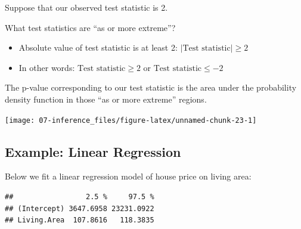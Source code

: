 \documentclass[
]{book}
\newenvironment{Shaded}{\begin{snugshade}}{\end{snugshade}}
\newcommand{\CommentTok}[1]{\textcolor[rgb]{0.56,0.35,0.01}{\textit{#1}}}
\newcommand{\DataTypeTok}[1]{\textcolor[rgb]{0.13,0.29,0.53}{#1}}
\newcommand{\KeywordTok}[1]{\textcolor[rgb]{0.13,0.29,0.53}{\textbf{#1}}}
\newcommand{\NormalTok}[1]{#1}
\newcommand{\OperatorTok}[1]{\textcolor[rgb]{0.81,0.36,0.00}{\textbf{#1}}}
\newcommand{\StringTok}[1]{\textcolor[rgb]{0.31,0.60,0.02}{#1}}
\providecommand{\tightlist}{%
  \setlength{\itemsep}{0pt}\setlength{\parskip}{0pt}}
\begin{document}
Suppose that our observed test statistic is 2.

What test statistics are ``as or more extreme''?

\begin{itemize}
\tightlist
\item
  Absolute value of test statistic is at least 2: \(|\text{Test statistic}| \geq 2\)
\item
  In other words: \(\text{Test statistic} \geq 2\) or \(\text{Test statistic} \leq -2\)
\end{itemize}

The p-value corresponding to our test statistic is the area under the probability density function in those ``as or more extreme'' regions.

\begin{center}\texttt{[image: 07-inference\_files/figure-latex/unnamed-chunk-23-1]} \end{center}

\hypertarget{example-linear-regression}{%
\subsection{Example: Linear Regression}\label{example-linear-regression}}

Below we fit a linear regression model of house price on living area:

\begin{Shaded}
\end{Shaded}

\begin{verbatim}
##                 2.5 %     97.5 %
## (Intercept) 3647.6958 23231.0922
## Living.Area  107.8616   118.3835
\end{verbatim}

\begin{Shaded}
\end{Shaded}
\end{document}
